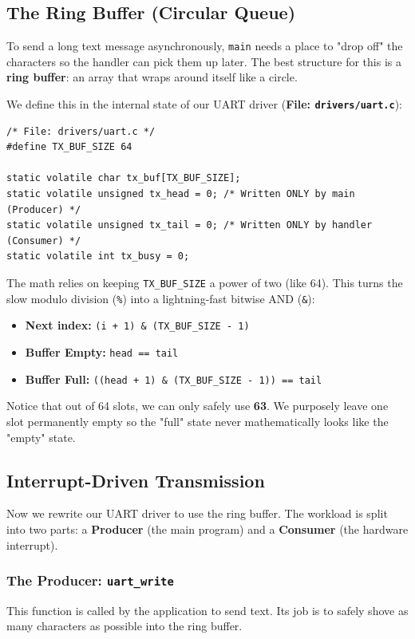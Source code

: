 \subsection{The Ring Buffer (Circular Queue)}
To send a long text message asynchronously, \texttt{main} needs a place to "drop off" the characters so the handler can pick them up later. The best structure for this is a \textbf{ring buffer}: an array that wraps around itself like a circle.

We define this in the internal state of our UART driver (\textbf{File: \texttt{drivers/uart.c}}):
\begin{lstlisting}
/* File: drivers/uart.c */
#define TX_BUF_SIZE 64

static volatile char tx_buf[TX_BUF_SIZE];
static volatile unsigned tx_head = 0; /* Written ONLY by main (Producer) */
static volatile unsigned tx_tail = 0; /* Written ONLY by handler (Consumer) */
static volatile int tx_busy = 0;
\end{lstlisting}

The math relies on keeping \texttt{TX\_BUF\_SIZE} a power of two (like 64). This turns the slow modulo division (\texttt{\%}) into a lightning-fast bitwise AND (\texttt{\&}):
\begin{itemize}
    \item \textbf{Next index:} \texttt{(i + 1) \& (TX\_BUF\_SIZE - 1)}
    \item \textbf{Buffer Empty:} \texttt{head == tail}
    \item \textbf{Buffer Full:} \texttt{((head + 1) \& (TX\_BUF\_SIZE - 1)) == tail}
\end{itemize}
Notice that out of 64 slots, we can only safely use \textbf{63}. We purposely leave one slot permanently empty so the "full" state never mathematically looks like the "empty" state.

\subsection{Interrupt-Driven Transmission}
Now we rewrite our UART driver to use the ring buffer. The workload is split into two parts: a \textbf{Producer} (the main program) and a \textbf{Consumer} (the hardware interrupt).

\subsubsection{The Producer: \texttt{uart\_write}}
This function is called by the application to send text. Its job is to safely shove as many characters as possible into the ring buffer. 

